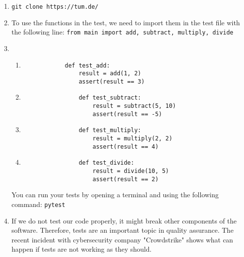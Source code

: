 \documentclass[english]{sheet}
\begin{document}
\begin{solution}
    \begin{enumerate}
        \item \texttt{git clone https://tum.de/}
	\item To use the functions in the test, we need to import them in the test file with the following line: \texttt{from main import add, subtract, multiply, divide}
        \item 
            \begin{enumerate}
                \item \begin{verbatim} 
			def test_add:
				result = add(1, 2)
				assert(result == 3)
		\end{verbatim}
		\item \begin{verbatim} 
				def test_subtract:
					result = subtract(5, 10)
					assert(result == -5)
			\end{verbatim}
		\item \begin{verbatim} 
				def test_multiply:
					result = multiply(2, 2)
					assert(result == 4)
			\end{verbatim}
		\item \begin{verbatim} 
				def test_divide:
					result = divide(10, 5)
					assert(result == 2)
			\end{verbatim}
            \end{enumerate}
            You can run your tests by opening a terminal and using the following command: \texttt{pytest}
	\item If we do not test our code properly, it might break other components of the software. Therefore, tests are an important topic in quality assurance. The recent incident with cybersecurity company "Crowdstrike" shows what can happen if tests are not working as they should.
    \end{enumerate}
\end{solution}
\end{document}
